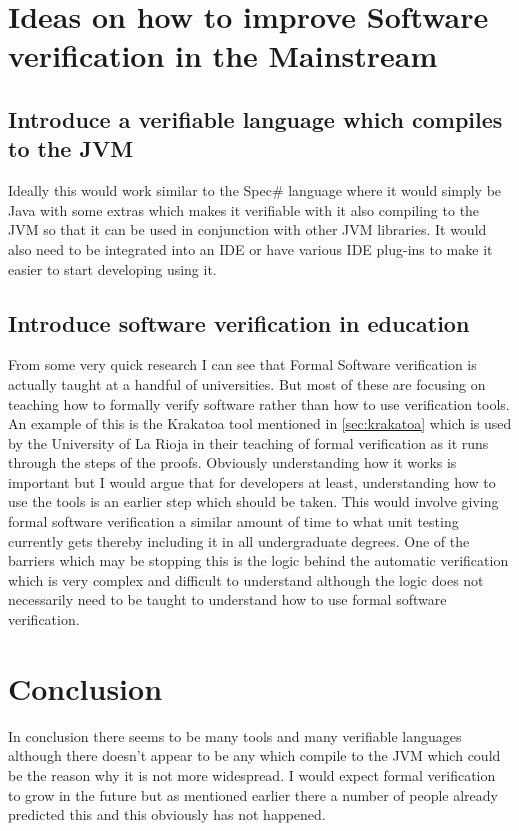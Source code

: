 \documentclass[a4paper,12pt]{scrartcl}
\begin{document}
	\section{Ideas on how to improve Software verification in the Mainstream}
	{
		\subsection{Introduce a verifiable language which compiles to the JVM}
		{
			Ideally this would work similar to the Spec\# language where it would simply be Java with some extras which makes it verifiable with it also compiling to the JVM so that it can be used in conjunction with other JVM libraries. It would also need to be integrated into an IDE or have various IDE plug-ins to make it easier to start developing using it.
		}
		\subsection{Introduce software verification in education}
		{
			From some very quick research I can see that Formal Software verification is actually taught at a handful of universities. But most of these are focusing on teaching how to formally verify software rather than  how to use verification tools. An example of this is the Krakatoa tool mentioned in \cref{sec:krakatoa} which is used by the University of La Rioja in their teaching of formal verification as it runs through the steps of the proofs\cite{Romero2018}. Obviously understanding how it works is important but I would argue that for developers at least, understanding how to use the tools is an earlier step which should be taken. This would involve giving formal software verification a similar amount of time to what unit testing currently gets thereby including it in all undergraduate degrees. One of the barriers which may be stopping this is the logic behind the automatic verification which is very complex and difficult to understand although the logic does not necessarily need to be taught to understand how to use formal software verification. 
		}
	}
	
	\section{Conclusion}
	{
		In conclusion there seems to be many tools and many verifiable languages although there doesn't appear to be any which compile to the JVM which could be the reason why it is not more widespread. I would expect formal verification to grow in the future but as mentioned earlier there a number of people already predicted this and this obviously has not happened. 
	}
	
	\newpage
	
	\printbibliography[heading=bibintoc,title=References]
\end{document}
